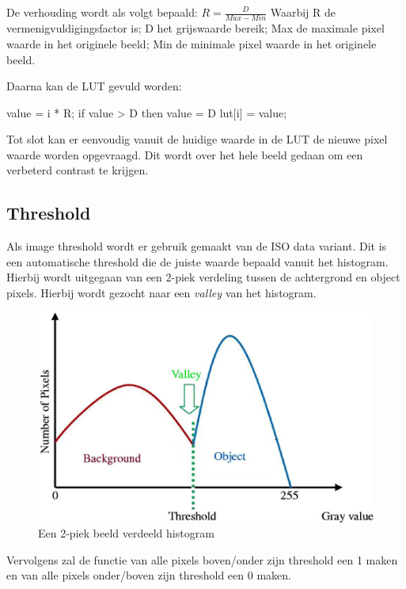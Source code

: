 De verhouding wordt als volgt bepaald:
$R = \frac{D}{Max - Min}$
Waarbij R de vermenigvuldigingsfactor is;
D het grijswaarde bereik;
Max de maximale pixel waarde in het originele beeld;
Min de minimale pixel waarde in het originele beeld.

Daarna kan de LUT gevuld worden:

\begin{cppcode}
value = i * R;
if value > D then value = D
lut[i] = value;
\end{cppcode}

Tot slot kan er eenvoudig vanuit de huidige waarde in de LUT de nieuwe pixel waarde
worden opgevraagd. Dit wordt over het hele beeld gedaan om een verbeterd contrast te
krijgen.

\subsection{Threshold}
\label{sub:threshold}
Als image threshold wordt er gebruik gemaakt van de ISO data variant. Dit is een
automatische threshold die de juiste waarde bepaald vanuit het histogram. Hierbij
wordt uitgegaan van een 2-piek verdeling tussen de achtergrond en object pixels.
Hierbij wordt gezocht naar een \emph{valley} van het histogram.

\begin{figure}
    \begin{center}
        \includegraphics[scale=0.35]{figures/histogram.png}
    \end{center}
    \caption{Een 2-piek beeld verdeeld histogram}
    \label{fig:histogram}
\end{figure}

Vervolgens zal de functie van alle pixels boven/onder zijn threshold een 1 maken
en van alle pixels onder/boven zijn threshold een 0 maken.

